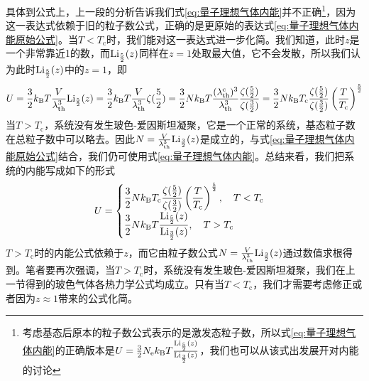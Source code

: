 \documentclass[../../main.tex]{subfiles}
\begin{document}
具体到公式上，上一段的分析告诉我们式\eqref{eq:量子理想气体内能}并不正确\footnote{考虑基态后原本的粒子数公式表示的是激发态粒子数，所以式\eqref{eq:量子理想气体内能}的正确版本是\(U=\frac{3}{2}N_{\mathrm{e}}k_{\mathrm{B}} T\frac{\mathrm{Li}_{\frac{5}{2}}(z)}{\mathrm{Li}_{\frac{3}{2}}(z)}\)，我们也可以从该式出发展开对内能的讨论}，因为这一表达式依赖于旧的粒子数公式，正确的是更原始的表达式\eqref{eq:量子理想气体内能原始公式}。当\(T<T_{\mathrm{c}}\)时，我们能对这一表达式进一步化简。我们知道，此时\(z\)是一个非常靠近1的数，而\(\mathrm{Li}_{\frac{5}{2}}(z)\)同样在\(z=1\)处取最大值，它不会发散，所以我们认为此时\(\mathrm{Li}_{\frac{5}{2}}(z)\)中的\(z=1\)，即
\begin{equation}
    U=\frac{3}{2}k_{\mathrm{B}} T\frac{V}{\lambda_{\mathrm{th}}^{3}}\mathrm{Li}_{\frac{5}{2}}(z)=\frac{3}{2}k_{\mathrm{B}} T\frac{V}{\lambda_{\mathrm{th}}^{3}}\zeta(\frac{5}{2})=\frac{3}{2}Nk_{\mathrm{B}} T\frac{(\lambda_{\mathrm{th}}^{\mathrm{c}})^3}{\lambda_{\mathrm{th}}^{3}}\frac{\zeta(\frac{5}{2})}{\zeta(\frac{3}{2})}=\frac{3}{2}Nk_{\mathrm{B}} T_{\mathrm{c}}\frac{\zeta(\frac{5}{2})}{\zeta(\frac{3}{2})}\left(\frac{T}{T_{\mathrm{c}}}\right)^{\frac{5}{2}}
\end{equation}
当\(T>T_{\mathrm{c}}\)，系统没有发生玻色-爱因斯坦凝聚，它是一个正常的系统，基态粒子数在总粒子数中可以略去。因此\(N=\frac{V}{\lambda_{\mathrm{th}}^{3}}\mathrm{Li}_{\frac{3}{2}}(z)\)是成立的，与式\eqref{eq:量子理想气体内能原始公式}结合，我们仍可使用式\eqref{eq:量子理想气体内能}。总结来看，我们把系统的内能写成如下的形式
\begin{equation}
    U=\begin{cases}
        \displaystyle \frac{3}{2}Nk_{\mathrm{B}} T_{\mathrm{c}}\frac{\zeta(\frac{5}{2})}{\zeta(\frac{3}{2})}\left(\frac{T}{T_{\mathrm{c}}}\right)^{\frac{5}{2}} ,\quad T<T_{\mathrm{c}}\\
        \displaystyle \frac{3}{2}Nk_{\mathrm{B}} T\frac{\mathrm{Li}_{\frac{5}{2}}(z)}{\mathrm{Li}_{\frac{3}{2}}(z)},\quad T>T_{\mathrm{c}}
    \end{cases}
\end{equation}
\(T>T_{\mathrm{c}}\)时的内能公式依赖于\(z\)，而它由粒子数公式\(N=\frac{V}{\lambda_{\mathrm{th}}^{3}}\mathrm{Li}_{\frac{3}{2}}(z)\)通过数值求根得到。笔者要再次强调，当\(T>T_{\mathrm{c}}\)时，系统没有发生玻色-爱因斯坦凝聚，我们在上一节得到的玻色气体各热力学公式均成立。只有当\(T<T_{\mathrm{c}}\)，我们才需要考虑修正或者因为\(z\approx1\)带来的公式化简。
\end{document}
